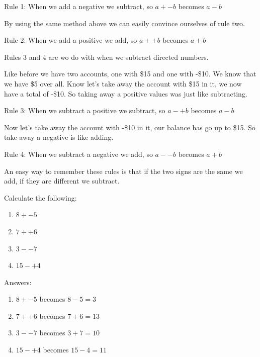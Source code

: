 \bigskip

Rule 1: When we add a negative we subtract, so $a + -b$ becomes $a - b$

\bigskip

By using the same method above we can easily convince ourselves of rule two.

\bigskip

Rule 2: When we add a positive we add, so $a + +b$ becomes $a + b$

\bigskip

Rules 3 and 4 are wo do with when we subtract directed numbers.

Like before we have two accounts, one with \$15 and one with -\$10.  We know that we have \$5 over all.  Know let's take away the account with \$15 in it, we now have a total of -\$10.  So taking away a positive values was just like subtracting.

\bigskip

Rule 3: When we subtract a positive we subtract, so $a - +b$ becomes $a - b$

\bigskip

Now let's take away the account with -\$10 in it, our balance has go up to \$15.  So take away a negative is like adding.

\bigskip

Rule 4: When we subtract a negative we add, so $a - -b$ becomes $a + b$

\bigskip

An easy way to remember these rules is that if the two signs are the same we add, if they are different we subtract.

\begin{exmp}
Calculate the following:
\begin{enumerate}
	\item $8 + -5$
	\item $7 + +6$
	\item $3 - -7$
	\item $15 - +4$
\end{enumerate}

Answers:
\begin{enumerate}
	\item $8 + -5$ becomes $8 - 5 = 3$
	\item $7 + +6$ becomes $7 + 6 = 13$
	\item $3 - -7$ becomes $3 + 7 = 10$
	\item $15 - +4$ becomes $15 - 4 = 11$
\end{enumerate}
\end{exmp}

